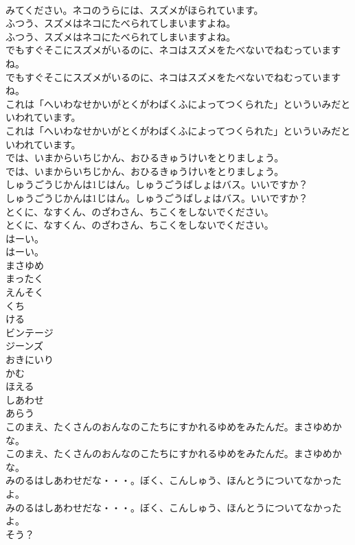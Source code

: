 \documentclass[8pt]{extreport}
\begin{document}
\begin{CJK}{UTF8}{min}
\\	みてください。ネコのうらには、スズメがほられています。
\\	ふつう、スズメはネコにたべられてしまいますよね。
\\	ふつう、スズメはネコにたべられてしまいますよね。
\\	でもすぐそこにスズメがいるのに、ネコはスズメをたべないでねむっていますね。
\\	でもすぐそこにスズメがいるのに、ネコはスズメをたべないでねむっていますね。
\\	これは「へいわなせかいがとくがわばくふによってつくられた」といういみだといわれています。
\\	これは「へいわなせかいがとくがわばくふによってつくられた」といういみだといわれています。
\\	では、いまからいちじかん、おひるきゅうけいをとりましょう。
\\	では、いまからいちじかん、おひるきゅうけいをとりましょう。
\\	しゅうごうじかんは1じはん。しゅうごうばしょはバス。いいですか？
\\	しゅうごうじかんは1じはん。しゅうごうばしょはバス。いいですか？
\\	とくに、なすくん、のざわさん、ちこくをしないでください。
\\	とくに、なすくん、のざわさん、ちこくをしないでください。
\\	はーい。
\\	はーい。
\\	まさゆめ
\\	まったく
\\	えんそく
\\	くち
\\	ける
\\	ビンテージ
\\	ジーンズ
\\	おきにいり
\\	かむ
\\	ほえる
\\	しあわせ
\\	あらう
\\	このまえ、たくさんのおんなのこたちにすかれるゆめをみたんだ。まさゆめかな。
\\	このまえ、たくさんのおんなのこたちにすかれるゆめをみたんだ。まさゆめかな。
\\	みのるはしあわせだな・・・。ぼく、こんしゅう、ほんとうについてなかったよ。
\\	みのるはしあわせだな・・・。ぼく、こんしゅう、ほんとうについてなかったよ。
\\	そう？

\end{CJK}
\end{document}

